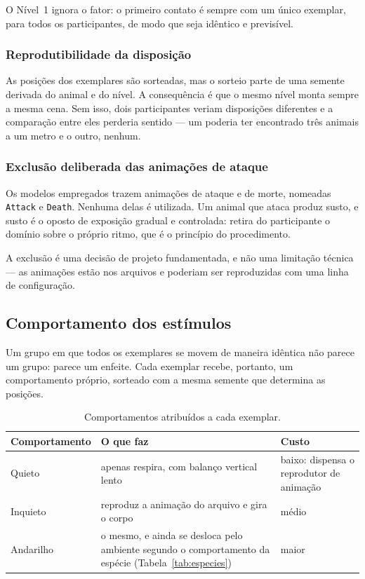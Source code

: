 O Nível~1 ignora o fator: o primeiro contato é sempre com um único
exemplar, para todos os participantes, de modo que seja idêntico e
previsível.

\subsubsection{Reprodutibilidade da disposição}

As posições dos exemplares são sorteadas, mas o sorteio parte de uma
semente derivada do animal e do nível. A consequência é que o mesmo nível
monta sempre a mesma cena. Sem isso, dois participantes veriam
disposições diferentes e a comparação entre eles perderia sentido --- um
poderia ter encontrado três animais a um metro e o outro, nenhum.

\subsubsection{Exclusão deliberada das animações de ataque}

Os modelos empregados trazem animações de ataque e de morte, nomeadas
\texttt{Attack} e \texttt{Death}. Nenhuma delas é utilizada. Um animal
que ataca produz susto, e susto é o oposto de exposição gradual e
controlada: retira do participante o domínio sobre o próprio ritmo, que é
o princípio do procedimento.

A exclusão é uma decisão de projeto fundamentada, e não uma limitação
técnica --- as animações estão nos arquivos e poderiam ser reproduzidas
com uma linha de configuração.

\subsection{Comportamento dos estímulos}

Um grupo em que todos os exemplares se movem de maneira idêntica não
parece um grupo: parece um enfeite. Cada exemplar recebe, portanto, um
comportamento próprio, sorteado com a mesma semente que determina as
posições.

\begin{table}[htbp]
\centering
\caption{Comportamentos atribuídos a cada exemplar.}
\label{tab:comportamentos}
\small
\begin{tabular}{p{2.9cm}p{6.4cm}p{2.8cm}}
\toprule
\textbf{Comportamento} & \textbf{O que faz} & \textbf{Custo} \\
\midrule
Quieto    & apenas respira, com balanço vertical lento & baixo: dispensa o reprodutor de animação \\
Inquieto  & reproduz a animação do arquivo e gira o corpo & médio \\
Andarilho & o mesmo, e ainda se desloca pelo ambiente segundo o comportamento da espécie (Tabela~\ref{tab:especies}) & maior \\
\bottomrule
\end{tabular}
\end{table}

